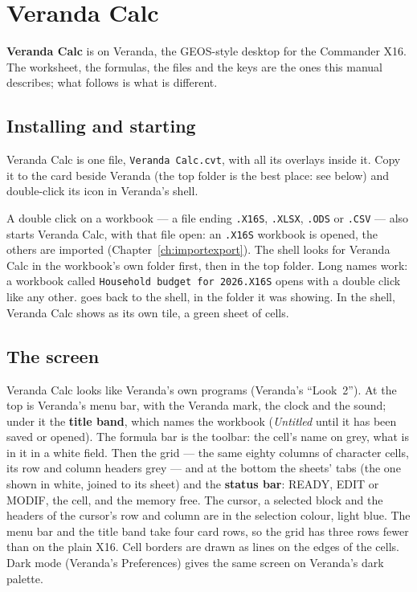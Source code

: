 \chapter{Veranda Calc}
\label{app:veranda}

\textbf{Veranda Calc} is \ccprod{} on Veranda, the GEOS-style desktop for the
Commander X16. The worksheet, the formulas, the files and the keys are the
ones this manual describes; what follows is what is different.

\section{Installing and starting}

Veranda Calc is one file, \texttt{Veranda Calc.cvt}, with all its overlays
inside it. Copy it to the card beside Veranda (the top folder is the best
place: see below) and double-click its icon in Veranda's shell.

A double click on a workbook --- a file ending \texttt{.X16S},
\texttt{.XLSX}, \texttt{.ODS} or \texttt{.CSV} --- also starts Veranda Calc,
with that file open: an \texttt{.X16S} workbook is opened, the others are
imported (Chapter~\ref{ch:importexport}). The shell looks for Veranda Calc
in the workbook's own folder first, then in the top folder. Long names
work: a workbook called \texttt{Household budget for 2026.X16S} opens
with a double click like any other.  goes back to
the shell, in the folder it was showing. In the shell, Veranda Calc shows
as its own tile, a green sheet of cells.

\section{The screen}

Veranda Calc looks like Veranda's own programs (Veranda's ``Look~2''). At
the top is Veranda's menu bar, with the Veranda mark, the clock and the
sound; under it the \textbf{title band}, which names the workbook
(\textit{Untitled} until it has been saved or opened). The formula bar is
the toolbar: the cell's name on grey, what is in it in a white field.
Then the grid --- the same eighty columns of character cells, its row and
column headers grey --- and at the bottom the sheets' tabs (the one shown
in white, joined to its sheet) and the \textbf{status bar}: \textsf{READY},
\textsf{EDIT} or \textsf{MODIF}, the cell, and the memory free. The
cursor, a selected block and the headers of the cursor's row and column
are in the selection colour, light blue. The menu bar and the title band
take four card rows, so the grid has three rows fewer than on the plain
X16. Cell borders are drawn as lines on the edges of the cells. Dark mode
(Veranda's Preferences) gives the same screen on Veranda's dark palette.

